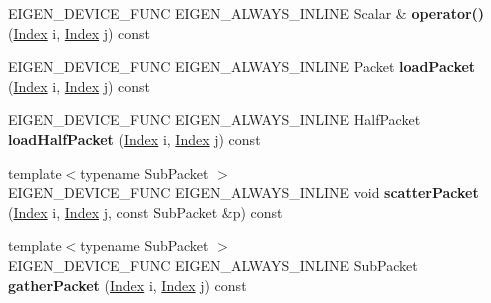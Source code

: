 \begin{DoxyCompactItemize}
\item 
\mbox{\label{class_eigen_1_1internal_1_1blas__data__mapper_acfc17ca5e17082a5ec461875239dfdbc}} 
E\+I\+G\+E\+N\+\_\+\+D\+E\+V\+I\+C\+E\+\_\+\+F\+U\+NC E\+I\+G\+E\+N\+\_\+\+A\+L\+W\+A\+Y\+S\+\_\+\+I\+N\+L\+I\+NE Scalar \& {\bfseries operator()} (\hyperlink{namespace_eigen_a62e77e0933482dafde8fe197d9a2cfde}{Index} i, \hyperlink{namespace_eigen_a62e77e0933482dafde8fe197d9a2cfde}{Index} j) const
\item 
\mbox{\label{class_eigen_1_1internal_1_1blas__data__mapper_ad82c65c2daa3e60f0ab6d96eab37b4f8}} 
E\+I\+G\+E\+N\+\_\+\+D\+E\+V\+I\+C\+E\+\_\+\+F\+U\+NC E\+I\+G\+E\+N\+\_\+\+A\+L\+W\+A\+Y\+S\+\_\+\+I\+N\+L\+I\+NE Packet {\bfseries load\+Packet} (\hyperlink{namespace_eigen_a62e77e0933482dafde8fe197d9a2cfde}{Index} i, \hyperlink{namespace_eigen_a62e77e0933482dafde8fe197d9a2cfde}{Index} j) const
\item 
\mbox{\label{class_eigen_1_1internal_1_1blas__data__mapper_ab20e83fe585195cf86f2f4f46409a186}} 
E\+I\+G\+E\+N\+\_\+\+D\+E\+V\+I\+C\+E\+\_\+\+F\+U\+NC E\+I\+G\+E\+N\+\_\+\+A\+L\+W\+A\+Y\+S\+\_\+\+I\+N\+L\+I\+NE Half\+Packet {\bfseries load\+Half\+Packet} (\hyperlink{namespace_eigen_a62e77e0933482dafde8fe197d9a2cfde}{Index} i, \hyperlink{namespace_eigen_a62e77e0933482dafde8fe197d9a2cfde}{Index} j) const
\item 
\mbox{\label{class_eigen_1_1internal_1_1blas__data__mapper_a026a62809b2eff9e14ccc8c22b26e5f0}} 
{\footnotesize template$<$typename Sub\+Packet $>$ }\\E\+I\+G\+E\+N\+\_\+\+D\+E\+V\+I\+C\+E\+\_\+\+F\+U\+NC E\+I\+G\+E\+N\+\_\+\+A\+L\+W\+A\+Y\+S\+\_\+\+I\+N\+L\+I\+NE void {\bfseries scatter\+Packet} (\hyperlink{namespace_eigen_a62e77e0933482dafde8fe197d9a2cfde}{Index} i, \hyperlink{namespace_eigen_a62e77e0933482dafde8fe197d9a2cfde}{Index} j, const Sub\+Packet \&p) const
\item 
\mbox{\label{class_eigen_1_1internal_1_1blas__data__mapper_ae947afd5dceca7c8f1d5c5f054e2ffcf}} 
{\footnotesize template$<$typename Sub\+Packet $>$ }\\E\+I\+G\+E\+N\+\_\+\+D\+E\+V\+I\+C\+E\+\_\+\+F\+U\+NC E\+I\+G\+E\+N\+\_\+\+A\+L\+W\+A\+Y\+S\+\_\+\+I\+N\+L\+I\+NE Sub\+Packet {\bfseries gather\+Packet} (\hyperlink{namespace_eigen_a62e77e0933482dafde8fe197d9a2cfde}{Index} i, \hyperlink{namespace_eigen_a62e77e0933482dafde8fe197d9a2cfde}{Index} j) const

\end{DoxyCompactItemize}
